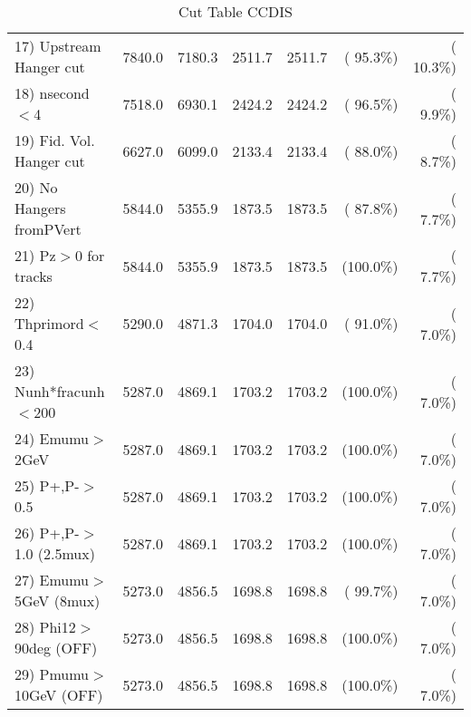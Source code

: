 \begin{table}[h!]
\begin{tabular}{||l||r|r|r|r|r|r||}
 17) Upstream Hanger cut  &       7840.0 &       7180.3 &       2511.7 &       2511.7 & ( 95.3\%) & ( 10.3\%) \\
 18) nsecond$<$4          &       7518.0 &       6930.1 &       2424.2 &       2424.2 & ( 96.5\%) & (  9.9\%) \\
 19) Fid. Vol. Hanger cut &       6627.0 &       6099.0 &       2133.4 &       2133.4 & ( 88.0\%) & (  8.7\%) \\
 20) No Hangers fromPVert &       5844.0 &       5355.9 &       1873.5 &       1873.5 & ( 87.8\%) & (  7.7\%) \\
 21) Pz$>$0 for tracks    &       5844.0 &       5355.9 &       1873.5 &       1873.5 & (100.0\%) & (  7.7\%) \\
 22) Thprimord$<$0.4      &       5290.0 &       4871.3 &       1704.0 &       1704.0 & ( 91.0\%) & (  7.0\%) \\
 23) Nunh*fracunh$<$200   &       5287.0 &       4869.1 &       1703.2 &       1703.2 & (100.0\%) & (  7.0\%) \\
 24) Emumu$>$2GeV         &       5287.0 &       4869.1 &       1703.2 &       1703.2 & (100.0\%) & (  7.0\%) \\
 25) P+,P-$>$0.5          &       5287.0 &       4869.1 &       1703.2 &       1703.2 & (100.0\%) & (  7.0\%) \\
 26) P+,P-$>$1.0 (2.5mux) &       5287.0 &       4869.1 &       1703.2 &       1703.2 & (100.0\%) & (  7.0\%) \\
 27) Emumu$>$5GeV  (8mux) &       5273.0 &       4856.5 &       1698.8 &       1698.8 & ( 99.7\%) & (  7.0\%) \\
 28) Phi12$>$90deg  (OFF) &       5273.0 &       4856.5 &       1698.8 &       1698.8 & (100.0\%) & (  7.0\%) \\
 29) Pmumu$>$10GeV  (OFF) &       5273.0 &       4856.5 &       1698.8 &       1698.8 & (100.0\%) & (  7.0\%) \\
 \hline
 \hline
 \end{tabular}
 \caption{Cut Table  CCDIS    }
 \label{tab-cutcohjpsi-mumu_ccdis}
 \end{table}
